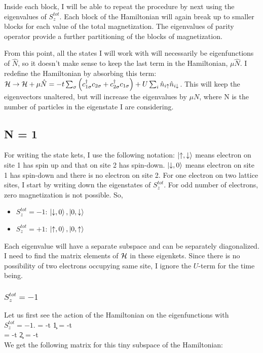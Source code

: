 \documentclass[12pt]{article}
\begin{document}
Inside each block, I will be able to repeat the procedure by next using the eigenvalues of \(S_z^{tot}\). Each block of the Hamiltonian will again break up to smaller blocks for each value of the total magnetization. The eigenvalues of parity operator provide a further partitioning of the blocks of magnetization.

From this point, all the states I will work with will necessarily be eigenfunctions of \(\hat{N}\), so it doesn't make sense to keep the last term in the Hamiltonian, \(\mu \hat{N}\). I redefine the Hamiltonian by absorbing this term: \(\mathcal{H} \rightarrow \mathcal{H} + \mu \hat{N} = -t\sum_\sigma\left({c_{{1}{\sigma}}^\dagger c_{{2}{\sigma}}+c_{{2}{\sigma}}^\dagger c_{{1}{\sigma}}}\right) + U\sum_i\hat{n}_{i\uparrow}\hat{n}_{i\downarrow}\). This will keep the eigenvectors unaltered, but will increase the eigenvalues by \(\mu N\), where N is the number of particles in the eigenstate I are considering.

\subsection{N = 1}
For writing the state kets, I use the following notation: \(\ket{\uparrow,\downarrow}\) means electron on site 1 has spin up and that on site 2 has spin-down. \(\ket{\downarrow, 0}\) means electron on site 1 has spin-down and there is no electron on site 2. 
\pp For one electron on two lattice sites, I start by writing down the eigenstates of \(S_z^{tot}\). For odd number of electrons, zero magnetization is not possible. So,
\begin{itemize}
\item \(S_z^{tot} = -1\): \(\ket{\downarrow,0}, \ket{0, \downarrow}\)
\item \(S_z^{tot} = +1\): \(\ket{\uparrow,0}, \ket{0, \uparrow}\)
\end{itemize}
Each eigenvalue will have a separate subspace and can be separately diagonalized. I need to find the matrix elements of \(\mathcal{H}\) in these eigenkets. Since there is no possibility of two electrons occupying same site, I ignore the \(U\)-term for the time being. 
\subsubsection{\(S_z^{tot} = -1\)}
Let us first see the action of the Hamiltonian on the eigenfunctions with \(S_z^{tot} = -1\).
\beq
\ham{} = -t \c{1}{\downarrow} = -t \\
\ham{} = -t \c{2}{\downarrow} = -t \\
\eeq
We get the following matrix for this tiny subspace of the Hamiltonian:
\beq
{}
\eeq
\end{document}
